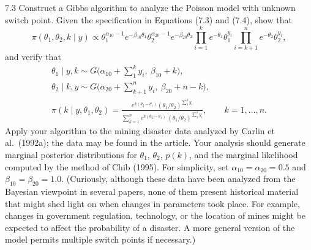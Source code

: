 \documentclass[11pt,a4paper]{article}
\numberwithin{equation}{questao}   %
\begin{document}
7.3 Construct a Gibbs algorithm to analyze the Poisson model with unknown switch point. Given the
specification in Equations (7.3) and (7.4), show that
\[
\pi(\theta_1,\theta_2,k\mid y)\propto\theta_1^{\alpha_{10}-1}e^{-\beta_{10}\theta_1}\theta_2^{\alpha_{20}-1}e^{-\beta_{20}\theta_2}
\prod_{i=1}^{k}e^{-\theta_1}\theta_1^{y_i}\prod_{i=k+1}^{n}e^{-\theta_2}\theta_2^{y_i},
\]
and verify that
\begin{gather*}
\theta_1\mid y,k\sim G\Big(\alpha_{10}+\sum_{1}^{k}y_i,\ \beta_{10}+k\Big),\\
\theta_2\mid k,y\sim G\Big(\alpha_{20}+\sum_{k+1}^{n}y_i,\ \beta_{20}+n-k\Big),\\
\pi(k\mid y,\theta_1,\theta_2)=\frac{e^{k(\theta_2-\theta_1)}(\theta_1/\theta_2)^{\sum_1^ky_i}}
{\sum_{k=1}^{n}e^{k(\theta_2-\theta_1)}\,(\theta_1/\theta_2)^{\sum_1^ky_i}},\qquad k=1,\dots,n.
\end{gather*}
Apply your algorithm to the mining disaster data analyzed by Carlin et al.\ (1992a); the data may be
found in the article. Your analysis should generate marginal posterior distributions for
$\theta_1$, $\theta_2$, $p(k)$, and the marginal likelihood computed by the method of Chib (1995).
For simplicity, set $\alpha_{10}=\alpha_{20}=0.5$ and $\beta_{10}=\beta_{20}=1.0$. (Curiously,
although these data have been analyzed from the Bayesian viewpoint in several papers, none of them
present historical material that might shed light on when changes in parameters took place. For
example, changes in government regulation, technology, or the location of mines might be expected
to affect the probability of a disaster. A more general version of the model permits multiple
switch points if necessary.)
\end{document}
